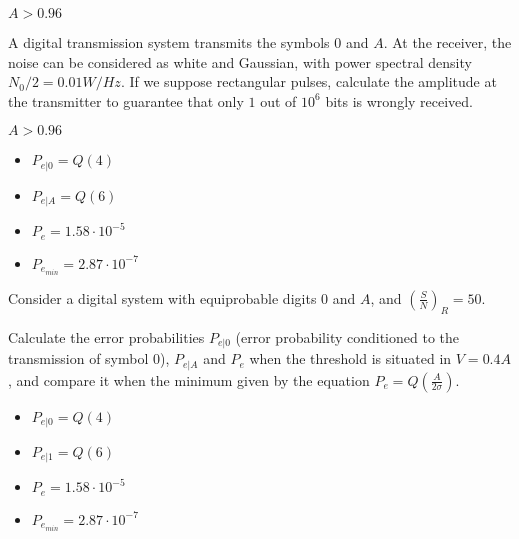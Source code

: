 \documentclass[idioma,boletin]{uah}
\begin{document}
{

$A > 0.96$

}
{

	A digital transmission system transmits the symbols $0$ and $A$. At the receiver, the noise can be considered as white and Gaussian, with power spectral density $N_0/2 = 0.01 W/Hz$. If we suppose rectangular pulses, calculate the amplitude at the transmitter to guarantee that only $1$ out of $10^6$ bits is wrongly received.
	
}
{

$A > 0.96$

}

{

\begin{itemize}
	\item $P_{e|0} = Q(4)$
	\item $P_{e|A} = Q(6)$
	\item $P_e = 1.58 \cdot 10^{-5}$
	\item $P_{e_{min}} = 2.87 \cdot 10^{-7}$
\end{itemize}
}
{

	Consider a digital system with equiprobable digits $0$ and $A$, and $\left ( \frac{S}{N} \right )_R=50$. 
	
	
	Calculate the error probabilities $P_{e|0}$ (error probability conditioned to the transmission of symbol 0), $P_{e|A}$ and $P_e$ when the threshold is situated in $V=0.4 A$, and compare it when the minimum given by the equation $P_e=Q\left ( \frac{A}{2\sigma} \right )$.
}
{

\begin{itemize}
	\item $P_{e|0} = Q(4)$
	\item $P_{e|1} = Q(6)$
	\item $P_e = 1.58 \cdot 10^{-5}$
	\item $P_{e_{min}} = 2.87 \cdot 10^{-7}$
\end{itemize}
}
\end{document}
